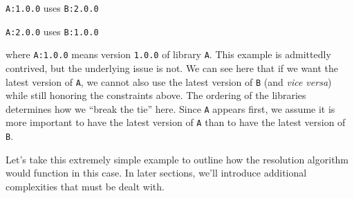 \documentclass[11pt,a4paper,twocolumn]{article}
\newcommand{\code}[1]{\texttt{#1}} %
\begin{document}
\begin{description}
  \item \code{A:1.0.0} uses \code{B:2.0.0}
  \item \code{A:2.0.0} uses \code{B:1.0.0}
\end{description}

where \code{A:1.0.0} means version \code{1.0.0} of library \code{A}.
This example is admittedly contrived, but the underlying issue
is not.  We can see here that if we want the latest version of
\code{A}, we cannot also use the latest version of \code{B} (and
\emph{vice versa}) while still honoring the constraints above.  The
ordering of the libraries determines how we ``break the tie'' here.
Since \code{A} appears first, we assume it is more important to have
the latest version of \code{A} than to have the latest version of
\code{B}.

Let's take this extremely simple example to outline how the resolution
algorithm would function in this case.  In later sections, we'll
introduce additional complexities that must be dealt with.
\end{document}
